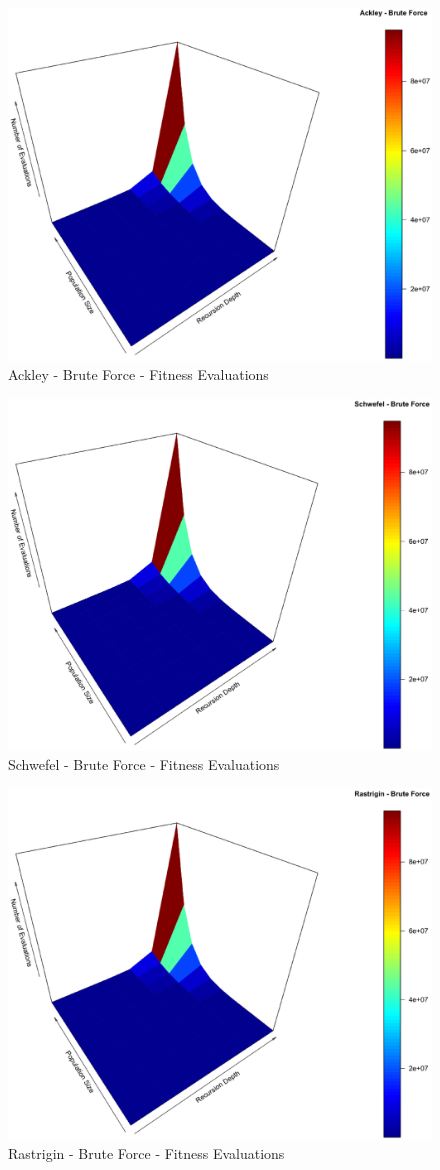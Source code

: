 \documentclass{svproc}
\begin{document}
\begin{figure}[tbp]
\centering
\includegraphics[width=1.0\hsize,height=0.65\hsize]{fig22.eps}
\caption{Ackley - Brute Force - Fitness Evaluations}
\label{fig27}
\end{figure}

\begin{figure}[tbp]
\centering
\includegraphics[width=1.0\hsize,height=0.65\hsize]{fig25.eps}
\caption{Schwefel - Brute Force - Fitness Evaluations}
\label{fig28}
\end{figure}

\begin{figure}[tbp]
\centering
\includegraphics[width=1.0\hsize,height=0.65\hsize]{fig28.eps}
\caption{Rastrigin - Brute Force - Fitness Evaluations}
\label{fig29}
\end{figure}
\end{document}
